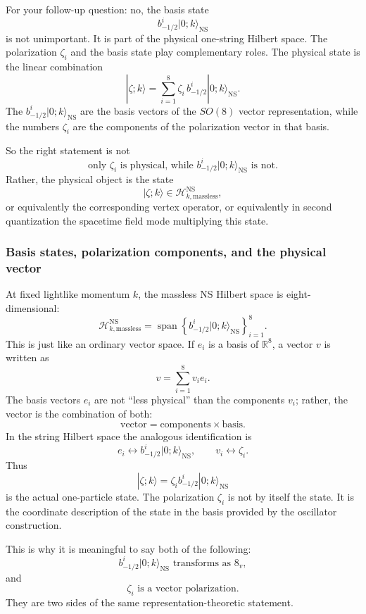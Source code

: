 \documentclass[
  10pt,
  a4paper,
  openany]{book}
\begin{document}
For your follow-up question: no, the basis state \[
b_{-1/2}^i|0;k\rangle_{\text{NS}}
\] is not unimportant. It is part of the physical one-string Hilbert
space. The polarization \(\zeta_i\) and the basis state play
complementary roles. The physical state is the linear combination \[
|\zeta;k\rangle
=
\sum_{i=1}^8 \zeta_i\, b_{-1/2}^i|0;k\rangle_{\text{NS}}.
\] The \(b_{-1/2}^i|0;k\rangle_{\text{NS}}\) are the basis vectors of
the \(SO(8)\) vector representation, while the numbers \(\zeta_i\) are
the components of the polarization vector in that basis.

So the right statement is not \[
\text{only }\zeta_i\text{ is physical, while }b_{-1/2}^i|0;k\rangle_{\text{NS}}\text{ is not}.
\] Rather, the physical object is the state \[
|\zeta;k\rangle\in \mathcal H_{k,\text{massless}}^{\text{NS}},
\] or equivalently the corresponding vertex operator, or equivalently in
second quantization the spacetime field mode multiplying this state.

\subsubsection{Basis states, polarization components, and the physical
vector}\label{basis-states-polarization-components-and-the-physical-vector}

At fixed lightlike momentum \(k\), the massless NS Hilbert space is
eight-dimensional: \[
\mathcal H_{k,\text{massless}}^{\text{NS}}
=
\operatorname{span}
\left\{
b_{-1/2}^i|0;k\rangle_{\text{NS}}
\right\}_{i=1}^8.
\] This is just like an ordinary vector space. If \(e_i\) is a basis of
\(\mathbb R^8\), a vector \(v\) is written as \[
v=\sum_{i=1}^8 v_i e_i.
\] The basis vectors \(e_i\) are not ``less physical'' than the
components \(v_i\); rather, the vector is the combination of both: \[
\text{vector}
=
\text{components}\times\text{basis}.
\] In the string Hilbert space the analogous identification is \[
e_i
\longleftrightarrow
b_{-1/2}^i|0;k\rangle_{\text{NS}},
\qquad
v_i
\longleftrightarrow
\zeta_i.
\] Thus \[
|\zeta;k\rangle
=
\zeta_i b_{-1/2}^i|0;k\rangle_{\text{NS}}
\] is the actual one-particle state. The polarization \(\zeta_i\) is not
by itself the state. It is the coordinate description of the state in
the basis provided by the oscillator construction.

This is why it is meaningful to say both of the following: \[
b_{-1/2}^i|0;k\rangle_{\text{NS}}
\text{ transforms as }8_v,
\] and \[
\zeta_i
\text{ is a vector polarization}.
\] They are two sides of the same representation-theoretic statement.
\end{document}
